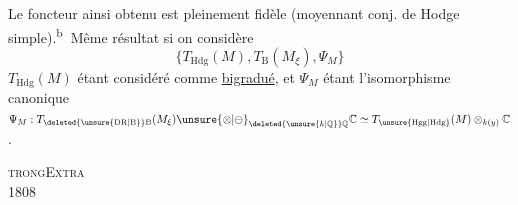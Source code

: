 Le foncteur  ainsi obtenu est pleinement fidèle (moyennant conj. de Hodge simple).\textsuperscript{\textcircled{b}} Même résultat si on considère
\[
\bigl\{T_{\mathrm{Hdg}}(M),T_{\mathrm B}(M_\xi),\Psi_M\bigr\}
\]
$T_{\mathrm{Hdg}}(M)$ étant considéré comme \uline{bigradué}, et $\Psi_M$ étant l'isomorphisme canonique $\Psi_M:T_{\deleted{\unsure{\mathrm{DR}|\mathrm B}}\mathrm B}(M_\xi)\unsure{\otimes|\ominus}_{\deleted{\unsure{k|\mathbb Q}}\mathbb Q}\mathbb C\simeq T_{\unsure{\mathrm{Hgg}|\mathrm{Hdg}}}(M)\otimes_{k(y)}\mathbb C$.
\par\noindent\textsc{trong}\hfill\textsc{Extra}\\
 1808\hfill{}

